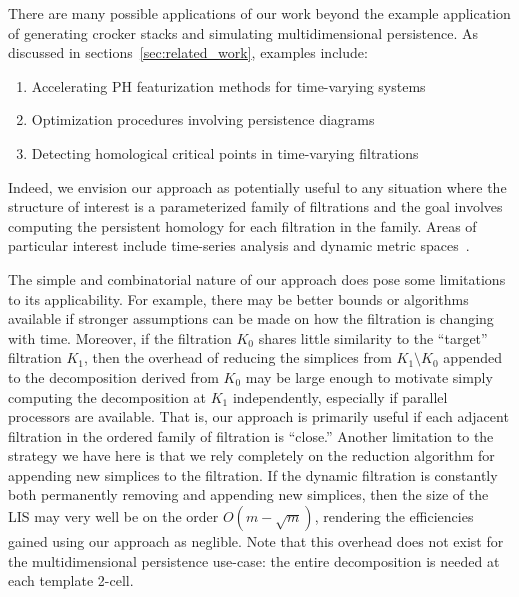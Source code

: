 \documentclass{article} %
\begin{document}
There are many possible applications of our work beyond the example application of generating crocker stacks and simulating multidimensional persistence. As discussed in sections~\ref{sec:related_work}, examples include: 
\begin{enumerate}
	\item Accelerating PH featurization methods for time-varying systems 
	\item Optimization procedures involving persistence diagrams
	\item Detecting homological critical points in time-varying filtrations
\end{enumerate}
Indeed, we envision our approach as potentially useful to any situation where the structure of interest is a parameterized family of filtrations and the goal involves computing the persistent homology for each filtration in the family. Areas of particular interest include time-series analysis and dynamic metric spaces~\cite{kim2020spatiotemporal}. 

The simple and combinatorial nature of our approach does pose some limitations to its applicability. For example, there may be better bounds or algorithms available if stronger assumptions can be made on how the filtration is changing with time. Moreover, if the filtration $K_0$ shares little similarity to the ``target'' filtration $K_1$, then the overhead of reducing the simplices from $K_1 \setminus K_0$ appended to the decomposition derived from $K_0$ may be large enough to motivate simply computing the decomposition at $K_1$ independently, especially if parallel processors are available. That is, our approach is primarily useful if each adjacent filtration in the ordered family of filtration is ``close.'' 
Another limitation to the strategy we have here is that we rely completely on the reduction algorithm for appending new simplices to the filtration. If the dynamic filtration is constantly both permanently removing and appending new simplices, then the size of the LIS may very well be on the order $O(m - \sqrt{m})$, rendering the efficiencies gained using our approach as neglible. Note that this overhead does not exist for the multidimensional persistence use-case: the entire decomposition is needed at each template 2-cell. 
\end{document}
